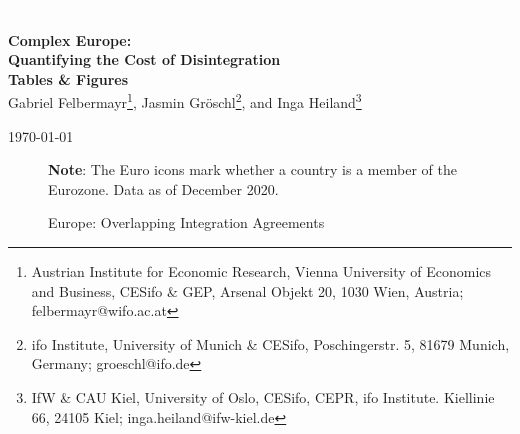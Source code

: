 \documentclass[a4paper,12pt]{article}
\begin{document}
\begin{titlepage}
 \begin{center}
\textcolor{white}{-}

\Huge{\textbf{Complex Europe:}\\ \textbf{Quantifying the Cost of Disintegration\\ Tables \& Figures}}\\[1.5cm]




\large{Gabriel Felbermayr\footnote{Austrian Institute for Economic Research, Vienna University of Economics and Business, CESifo \& GEP, Arsenal Objekt 20, 1030 Wien, Austria; felbermayr@wifo.ac.at}, Jasmin Gr\"oschl\footnote{ifo Institute, University of Munich \& CESifo, Poschingerstr. 5, 81679 Munich, Germany; groeschl@ifo.de}, and Inga Heiland\footnote{IfW \& CAU Kiel, University of Oslo, CESifo, CEPR, ifo Institute. Kiellinie 66, 24105 Kiel; inga.heiland@ifw-kiel.de}}\\

\bigskip



\large {\today}

\renewcommand{\baselinestretch}{1.0}



\end{center}
 \end{titlepage}

\newpage
\setcounter{page}{1}
\begin{figure}[htb!]
\caption{Europe: Overlapping Integration Agreements}
\vspace{0.25cm}
\label{fig:schengenmap}
\centering
\medskip
\footnotesize{\textbf{Note}: The Euro icons mark whether a country is a member of the Eurozone. Data as of December 2020.}
\end{figure}
\end{document}
